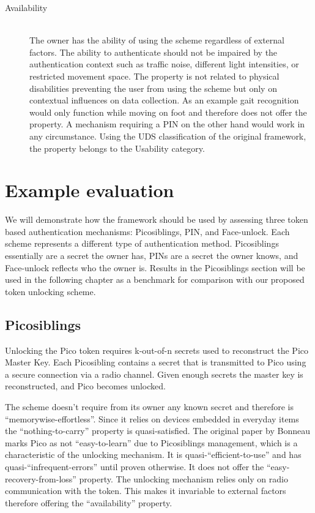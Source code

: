 \begin{description}
  \item[Availability] \hfill \\
  The owner has the ability of using the scheme regardless of external factors. The ability to authenticate should not be impaired by the authentication context such as traffic noise, different light intensities, or restricted movement space. The property is not related to physical disabilities preventing the user from using the scheme but only on contextual influences on data collection. As an example gait recognition would only function while moving on foot and therefore does not offer the property. A mechanism requiring a PIN on the other hand would work in any circumstance. Using the UDS classification of the original framework, the property belongs to the Usability category.
  
\end{description}

\section{Example evaluation}
We will demonstrate how the framework should be used by assessing three token based authentication mechanisms: Picosiblings, PIN, and Face-unlock. Each scheme represents a different type of authentication method. Picosiblings essentially are a secret the owner has, PINs are a secret the owner knows, and Face-unlock reflects who the owner is. Results in the Picosiblings section will be used in the following chapter as a benchmark for comparison with our proposed token unlocking scheme.

	\subsection{Picosiblings}
	Unlocking the Pico token requires k-out-of-n secrets used to reconstruct the Pico Master Key. Each Picosibling contains a secret that is transmitted to Pico using a secure connection via a radio channel. Given enough secrets the master key is reconstructed, and Pico becomes unlocked.
	
	The scheme doesn't require from its owner any known secret and therefore is ``memorywise-effortless''. Since it relies on devices embedded in everyday items the ``nothing-to-carry'' property is quasi-satisfied. The original paper by Bonneau marks Pico as not ``easy-to-learn'' due to Picosiblings management, which is a characteristic of the unlocking mechanism. It is quasi-``efficient-to-use'' and has quasi-``infrequent-errors'' until proven otherwise. It does not offer the ``easy-recovery-from-loss'' property. The unlocking mechanism relies only on radio communication with the token. This makes it invariable to external factors therefore offering the ``availability'' property.
	
